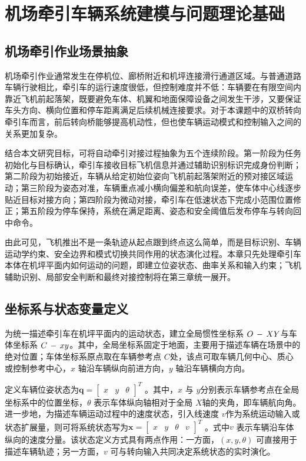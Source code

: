 \chapter{机场牵引车辆系统建模与问题理论基础}

\section{机场牵引作业场景抽象}

机场牵引作业通常发生在停机位、廊桥附近和机坪连接滑行通道区域。与普通道路车辆行驶相比，牵引车的运行速度很低，但控制难度并不低：车辆要在有限空间内靠近飞机前起落架，既要避免车体、机翼和地面保障设备之间发生干涉，又要保证车头方向、横向位置和停车距离满足后续机械连接要求。对于本课题中的双桥转向牵引车而言，前后转向桥能够提高机动性，但也使车辆运动模式和控制输入之间的关系更加复杂。

结合本文研究目标，可将自动牵引对接过程抽象为五个连续阶段。第一阶段为任务初始化与目标确认，牵引车接收目标飞机信息并通过辅助识别标识完成身份判断；第二阶段为初始接近，车辆从给定初始位姿向飞机前起落架附近的预对接区域运动；第三阶段为姿态对准，车辆重点减小横向偏差和航向误差，使车体中心线逐步贴近目标对接方向；第四阶段为微动对接，牵引车在低速状态下完成小范围位置修正；第五阶段为停车保持，系统在满足距离、姿态和安全阈值后发布停车与转向回中命令。

由此可见，飞机推出不是一条轨迹从起点跟到终点这么简单，而是目标识别、车辆运动学约束、安全边界和模式切换共同作用的状态演化过程\cite{ref17,ref18,ref19,ref20,ref21}。本章只先处理牵引车本体在机坪平面内如何运动的问题，即建立位姿状态、曲率关系和输入约束；飞机辅助识别、局部安全判断和最终对接控制将在第三章统一展开。

\section{坐标系与状态变量定义}

为统一描述牵引车在机坪平面内的运动状态，建立全局惯性坐标系
\(O\text{\,} - \text{\,}XY\)与车体坐标系
\(C\text{\,} - \text{\,}xy\)。其中，全局坐标系固定于地面，主要用于描述车辆在场景中的绝对位置；车体坐标系原点取在车辆参考点
\(C\)处，该点可取车辆几何中心、质心或控制参考中心，\(x\)
轴沿车辆纵向前进方向，\(y\) 轴沿车辆横向方向。

定义车辆位姿状态为\(\mathbf{q} = \begin{bmatrix}
x & y & \theta
\end{bmatrix}^{T}\) 。其中，\(x\) 与
\(y\)分别表示车辆参考点在全局坐标系中的位置坐标，\(\theta\)
表示车体纵向轴相对于全局
\(X\)轴的夹角，即车辆航向角。进一步地，为描述车辆运动过程中的速度状态，引入线速度
\(v\)作为系统运动输入或状态扩展量，则可将系统状态写为\(\mathbf{x} = \begin{bmatrix}
x & y & \theta & v
\end{bmatrix}^{T}\) 。式中\(v\)
表示车辆沿车体纵向的速度分量。该状态定义方式具有两点作用：一方面，\(\left( x,y,\theta \right)\)
可直接用于描述车辆轨迹；另一方面，\(v\)
可与转向输入共同决定系统状态的实时演化。

